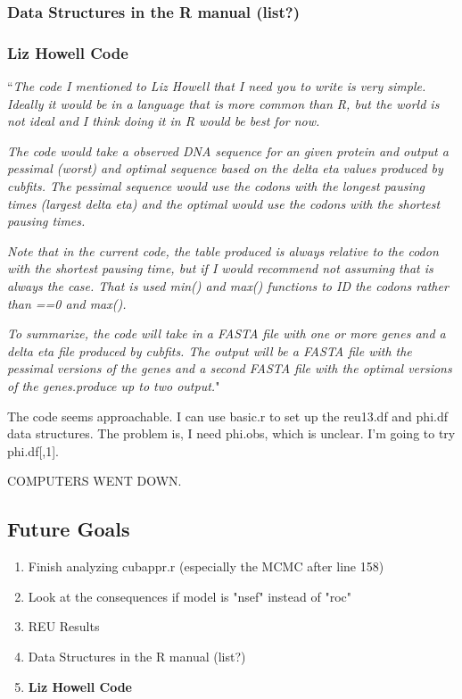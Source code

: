 \documentclass[11pt]{article} %
\begin{document}
\subsubsection{Data Structures in the R manual (list?)}

\subsubsection{Liz Howell Code}
``\textit{The code I mentioned to Liz Howell that I need you to write is very simple. Ideally it would be in a language that is more common than R, but the world is not ideal and I think doing it in R would be best for now.}

\textit{The code would take a observed DNA sequence for an given protein and output a pessimal (worst) and optimal sequence based on the delta eta values produced by cubfits.  The pessimal sequence would use the codons with the longest pausing times (largest delta eta) and the optimal would use the codons with the shortest pausing times.}

\textit{Note that in the current code, the table produced is always relative to the codon with the shortest pausing time, but if I would recommend not assuming that is always the case.  That is used min() and max() functions to ID the codons rather than ==0 and max().}

\textit{To summarize, the code will take in a FASTA file with one or more genes and a delta eta file produced by cubfits.  The output will be a FASTA file with the pessimal versions of the genes and a second FASTA file with the optimal versions of the genes.produce up to two output.}"


The code seems approachable. I can use basic.r to set up the reu13.df and phi.df data structures. The problem is, I need phi.obs, which is unclear. I'm going to try phi.df[,1].

COMPUTERS WENT DOWN.


\subsection{Future Goals}
\begin{enumerate}
\item Finish analyzing cubappr.r (especially the MCMC after line 158)
\item Look at the consequences if model is "nsef" instead of "roc"
\item REU Results
\item Data Structures in the R manual (list?)
\item \textbf{Liz Howell Code}
\end{enumerate}
\end{document}
